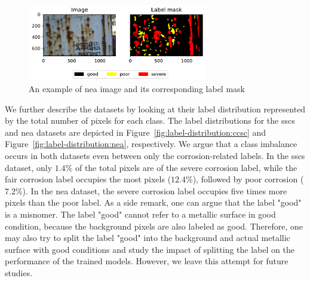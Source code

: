 \documentclass[mathematics,article,submit,pdftex,moreauthors]{Definitions/mdpi}
\begin{document}
\begin{figure}[htbp]
    \begin{center}
    \includegraphics[width=0.7\textwidth]{figures/nea-example.pdf}
    \caption{An example of \ac{nea} image and its corresponding label mask}
    \label{fig:dataset:nea-example}
    \end{center}
\end{figure}

We further describe the datasets by looking at their label
distribution represented by the total number of pixels for each 
class. The label distributions for the \ac{sscs} and \ac{nea}
datasets are depicted in Figure~\ref{fig:label-distribution:ccsc}
and Figure~\ref{fig:label-distribution:nea}, respectively.
We argue that a class imbalance occurs in both datasets
even between only the corrosion-related labels. In the \ac{sscs}
dataset, only $1.4\%$ of the total pixels are of the severe
corrosion label, while the fair corrosion label occupies
the most pixels ($12.4\%$), followed by poor corrosion ($7.2\%$).
In the \ac{nea} dataset, the severe corrosion label occupies
five times more pixels than the poor label. As a side remark,
one can argue that the label "good" is a misnomer. The 
label "good" cannot refer to a metallic surface in good 
condition, because the background pixels are also labeled as good.
Therefore, one may also try to split the label "good" into
the background and actual metallic surface with good conditions
and study the impact of splitting the label on the performance
of the trained models. However, we leave this attempt for future studies.
\end{document}
